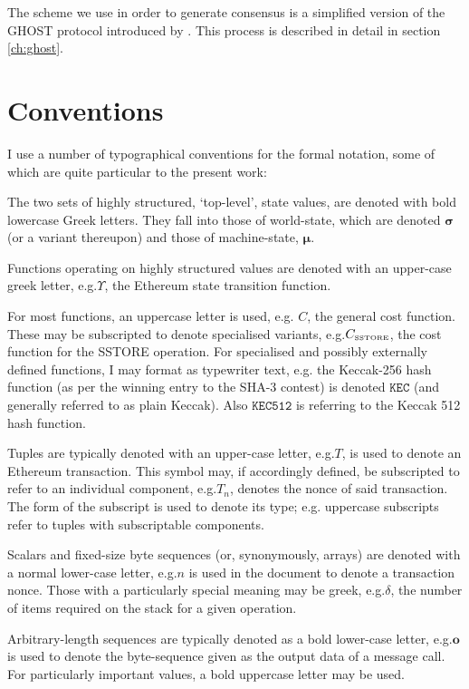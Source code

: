 \documentclass[9pt,oneside]{amsart}
\makeatletter
\newcommand*\eg{e.g.\@\xspace}
\makeatother
\begin{document}
\begin{multicols}{2}
The scheme we use in order to generate consensus is a simplified version of the GHOST protocol introduced by \cite{cryptoeprint:2013:881}. This process is described in detail in section \ref{ch:ghost}.

\section{Conventions}\label{ch:conventions}

I use a number of typographical conventions for the formal notation, some of which are quite particular to the present work:

The two sets of highly structured, `top-level', state values, are denoted with bold lowercase Greek letters. They fall into those of world-state, which are denoted $\boldsymbol{\sigma}$ (or a variant thereupon) and those of machine-state, $\boldsymbol{\mu}$.

Functions operating on highly structured values are denoted with an upper-case greek letter, \eg $\Upsilon$, the Ethereum state transition function.

For most functions, an uppercase letter is used, e.g. $C$, the general cost function. These may be subscripted to denote specialised variants, \eg $C_\text{\tiny SSTORE}$, the cost function for the {\tiny SSTORE} operation. For specialised and possibly externally defined functions, I may format as typewriter text, \eg the Keccak-256 hash function (as per the winning entry to the SHA-3 contest) is denoted $\texttt{KEC}$ (and generally referred to as plain Keccak). Also $\texttt{KEC512}$ is referring to the Keccak 512 hash function.

Tuples are typically denoted with an upper-case letter, \eg $T$, is used to denote an Ethereum transaction. This symbol may, if accordingly defined, be subscripted to refer to an individual component, \eg $T_n$, denotes the nonce of said transaction. The form of the subscript is used to denote its type; \eg uppercase subscripts refer to tuples with subscriptable components.

Scalars and fixed-size byte sequences (or, synonymously, arrays) are denoted with a normal lower-case letter, \eg $n$ is used in the document to denote a transaction nonce. Those with a particularly special meaning may be greek, \eg $\delta$, the number of items required on the stack for a given operation.

Arbitrary-length sequences are typically denoted as a bold lower-case letter, \eg $\mathbf{o}$ is used to denote the byte-sequence given as the output data of a message call. For particularly important values, a bold uppercase letter may be used.


\end{multicols}
\end{document}
